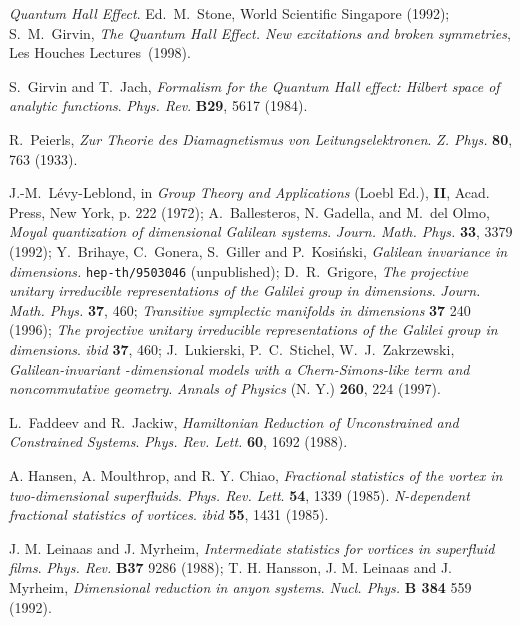 \documentclass[a4paper,11pt]{article}
\begin{document}
\begin{thebibliography}{99}
  {\it Quantum Hall Effect}.
Ed.~M.~Stone, World Scientific Singapore (1992);
S.~M.~Girvin,  {\it The Quantum Hall Effect.
New excitations and broken symmetries},
Les Houches Lectures~(1998).

S.~Girvin and T.~Jach,
{\it Formalism for the Quantum Hall effect: Hilbert space of
analytic functions}.
{\sl Phys. Rev}. {\bf B29}, 5617 (1984).

R.~Peierls,
{\it Zur Theorie des Diamagnetismus von Leitungselektronen}.
{\sl Z. Phys.} {\bf 80}, 763 (1933).

J.-M.~L\'evy-Leblond,
in {\it Group Theory and Applications} (Loebl Ed.),
{\bf II}, Acad. Press, New York, p. 222 (1972);
A.~Ballesteros, N. Gadella, and M.~del Olmo,
{\it Moyal quantization of \coordHE{} dimensional
   Galilean systems}.
  {\sl Journ. Math. Phys.} {\bf 33}, 3379 (1992);
Y.~Brihaye, C.~Gonera, S.~Giller and P.~Kosi\'nski,
  {\it Galilean invariance in \coordHE{} dimensions.}
\texttt {hep-th/9503046} (unpublished);
D.~R.~Grigore,
  {\it The projective unitary irreducible representations of the
  Galilei group in \coordHE{} dimensions}.
  {\sl Journ. Math. Phys.} {\bf 37}, 460;
  {\it Transitive symplectic manifolds in \coordHE{} dimensions}
   {\bf 37} 240 (1996);
   {\it The projective unitary irreducible representations of the
  Galilei group in \coordHE{} dimensions}. {\sl ibid} {\bf 37}, 460;
J.~Lukierski, P.~C.~Stichel, W.~J.~Zakrzewski,
   {\it Galilean-invariant \coordHE{}-dimensional models with a
     Chern-Simons-like term and \coordHE{} noncommutative geometry}.
  {\sl Annals of Physics}  (N. Y.) {\bf 260}, 224 (1997).

L.~Faddeev and R.~Jackiw,
{\it Hamiltonian Reduction of
Unconstrained and Constrained Systems}.
{\sl Phys. Rev. Lett.} {\bf 60}, 1692 (1988).

A. Hansen, A. Moulthrop, and R. Y. Chiao,
{\it Fractional statistics of the vortex in two-dimensional superfluids}.
{\sl Phys. Rev. Lett}. {\bf 54}, 1339 (1985).
{\it N-dependent fractional statistics of \coordHE{} vortices}.
{\sl ibid} {\bf 55}, 1431 (1985).

J. M. Leinaas and J. Myrheim,
{\it Intermediate statistics for vortices in superfluid films}.
{\sl Phys. Rev.} {\bf B37}  9286 (1988);
  T. H. Hansson, J. M. Leinaas and J. Myrheim,
{\it Dimensional reduction in anyon systems}.
{\sl Nucl. Phys.} {\bf B 384}  559 (1992).


\end{thebibliography}
\end{document}
